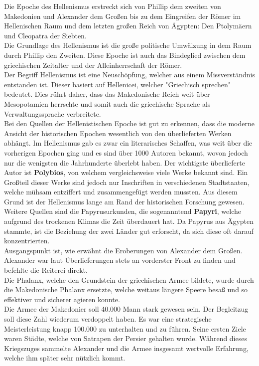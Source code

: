 \documentclass{article}
\begin{document}
	Die Epoche des Hellenismus erstreckt sich von Phillip dem zweiten von Makedonien und Alexander dem Großen bis zu dem Eingreifen der Römer im Hellenischen Raum und dem letzten großen Reich von Ägypten: Den Ptolymäern und Cleopatra der Siebten. \\
	Die Grundlage des Hellenismus ist die große politische Umwälzung in dem Raum durch Phillip den Zweiten. Diese Epoche ist auch das Bindeglied zwischen dem griechischen Zeitalter und der Alleinherrschaft der Römer. \\
	Der Begriff Hellenismus ist eine Neuschöpfung, welcher aus einem Missverständnis entstanden ist. Dieser basiert auf Hellenicei, welcher "Griechisch sprechen" bedeutet. Dies rührt daher, dass das Makedonische Reich weit über Mesopotamien herrschte und somit auch die griechische Sprache als Verwaltungssprache verbreitete. \\
	Bei den Quellen der Hellenistischen Epoche ist gut zu erkennen, dass die moderne Ansicht der historischen Epochen wesentlich von den überlieferten Werken abhängt. Im Hellenismus gab es zwar ein literarisches Schaffen, was weit über die vorherigen Epochen ging und es sind über 1000 Autoren bekannt, wovon jedoch nur die wenigsten die Jahrhunderte überlebt haben. Der wichtigste überlieferte Autor ist \textbf{Polybios}, von welchem vergleichsweise viele Werke bekannt sind. Ein Großteil dieser Werke sind jedoch nur Inschriften in verschiedenen Stadtstaaten, welche mühsam entziffert und zusammengefügt werden mussten. Aus diesem Grund ist der Hellenismus lange am Rand der historischen Forschung gewesen. Weitere Quellen sind die Papyrusurkunden, die sogenanntend \textbf{Papyri}, welche aufgrund des trockenen Klimas die Zeit überdauert hat. Da Papyrus aus Ägypten stammte, ist die Beziehung der zwei Länder gut erforscht, da sich diese oft darauf konzentrierten. \\
	Ausgangspunkt ist, wie erwähnt die Eroberungen von Alexander dem Großen. Alexander war laut Überlieferungen stets an vorderster Front zu finden und befehlte die Reiterei direkt. \\
	Die Phalanx, welche den Grundstein der griechischen Armee bildete, wurde durch die Makedonische Phalanx ersetzte, welche weitaus längere Speere besaß und so effektiver und sicherer agieren konnte. \\
	Die Armee der Makedonier soll 40.000 Mann stark gewesen sein. Der Begleitzug soll diese Zahl wiederum verdoppelt haben. Es war eine strategische Meisterleistung knapp 100.000 zu unterhalten und zu führen. Seine ersten Ziele waren Städte, welche von Satrapen der Persier gehalten wurde. Während dieses Kriegszuges sammelte Alexander und die Armee insgesamt wertvolle Erfahrung, welche ihm später sehr nützlich kommt. \\
\end{document}

